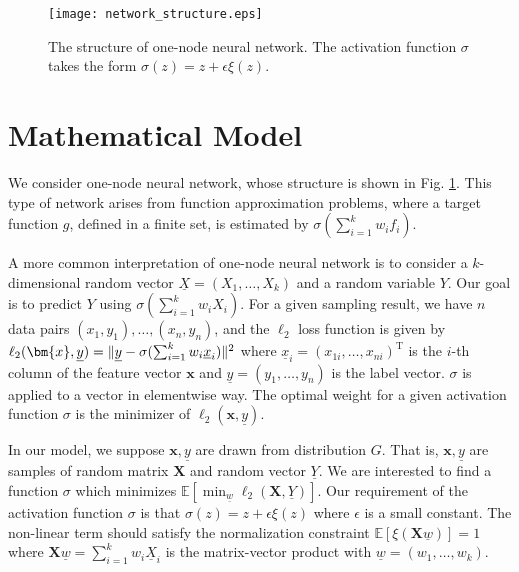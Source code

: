 \documentclass[conference]{IEEEtran}
\DeclarePairedDelimiter\norm{\lVert}{\rVert}
\def\E{\mathbb{E}}
\def\T{\mathrm{T}}
\begin{document}
\begin{figure}
\texttt{[image: network\_structure.eps]}
\caption{The structure of one-node neural network. The activation function $\sigma$ takes the form $\sigma(z)=z + \epsilon \xi(z)$.}\label{fig:ns}
\end{figure}

\section{Mathematical Model}\label{sec:mm}
We consider one-node neural network, whose structure is shown in Fig. \ref{fig:ns}.
This type of network arises from function approximation problems, where a target function $g$, defined in a finite set,
is estimated by $\sigma(\sum_{i=1}^k w_i f_i)$. %

A more common interpretation of one-node neural network is to consider a $k$-dimensional random vector $\underline{X}=(X_1, \dots, X_k)$ and a random variable $Y$.
Our goal is to predict $Y$ using $ \sigma(\sum_{i=1}^k w_i X_i)$.
For a given sampling result, we have $n$ data pairs $(x_1, y_1), \dots, (x_n, y_n)$, and
the $\ell_2$ loss function is given by
$\ell_2(\bm{x},\underline{y}) = \norm{\underline{y} - \sigma(\sum_{i=1}^k w_i \underline{x}_i)}^2 $
where $\underline{x}_i= (x_{1i}, \dots, x_{ni})^\T$ is the $i$-th column of the feature vector $\bm{x}$ and
$\underline{y} = (y_1, \dots, y_n)$ is the label vector. $\sigma$ is applied to a vector in elementwise way.
The optimal weight for a given activation function $\sigma$ is the minimizer of $\ell_2(\bm{x},\underline{y})$.



In our model, we suppose $\bm{x},\underline{y}$ are drawn from distribution $G$.
That is, $\bm{x},\underline{y}$ are samples of random matrix $\bm{X}$ and random vector $\underline{Y}$.
We are interested to find a function $\sigma$ which minimizes
$\E[ \min_{\underline{w}} \ell_2(\bm{X},\underline{Y})]$.
Our requirement of the activation function $\sigma$ is that
$\sigma(z) = z + \epsilon \xi(z)$ where
$\epsilon$ is a small constant. The non-linear term should satisfy the normalization constraint
$\E[\xi(\bm{X}\underline{w})]=1$ where
$\bm{X}\underline{w} = \sum_{i=1}^k w_i \underline{X}_i$ is the matrix-vector product with  $\underline{w}=(w_1, \dots, w_k)$.
\end{document}
